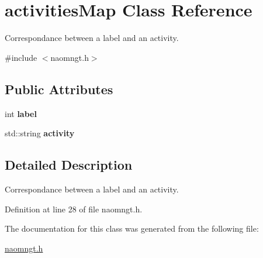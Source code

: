\hypertarget{classactivities_map}{
\section{activitiesMap Class Reference}
\label{classactivities_map}
}


Correspondance between a label and an activity.  




{\ttfamily \#include $<$naomngt.h$>$}

\subsection*{Public Attributes}
\begin{DoxyCompactItemize}
\item 
\hypertarget{classactivities_map_ad860c783388b3d9a17a4d626fea7363b}{
int {\bfseries label}}
\label{classactivities_map_ad860c783388b3d9a17a4d626fea7363b}

\item 
\hypertarget{classactivities_map_a4b4fe17fbbf6daed052ff1ce6412e226}{
std::string {\bfseries activity}}
\label{classactivities_map_a4b4fe17fbbf6daed052ff1ce6412e226}

\end{DoxyCompactItemize}


\subsection{Detailed Description}
Correspondance between a label and an activity. 

Definition at line 28 of file naomngt.h.



The documentation for this class was generated from the following file:\begin{DoxyCompactItemize}
\item 
\hyperlink{naomngt_8h}{naomngt.h}\end{DoxyCompactItemize}

